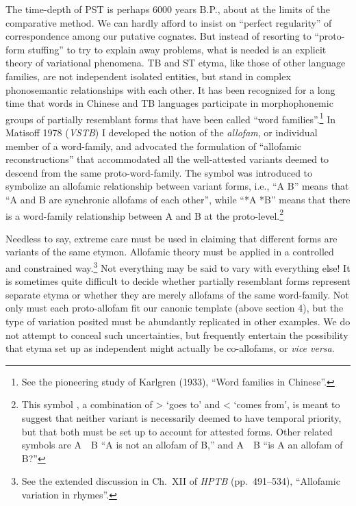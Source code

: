 The time-depth of PST is perhaps 6000 years B.P., about at the limits of the
comparative method. We can hardly afford to insist on “perfect regularity” of
correspondence among our putative cognates. But instead of resorting to
“proto-form stuffing” to try to explain away problems, what is needed is an
explicit theory of variational phenomena. TB and ST etyma, like those of other
language families, are not independent isolated entities, but stand in complex
phonosemantic relationships with each other. It has been recognized for a long
time that words in Chinese and TB languages participate in morphophonemic groups
of partially resemblant forms that have been called “word families”.\footnote{See the pioneering study of Karlgren (1933), “Word families in Chinese”.}  In
Matisoff 1978 (\textit{VSTB}) I developed the notion of the \textit{allofam},
or individual member
of a word-family, and advocated the formulation of “allofamic reconstructions”
that accommodated all the well-attested variants deemed to descend from the same
proto-word-family. The symbol  was introduced to symbolize an allofamic
relationship between variant forms, i.e., “A  B” means that “A and B are
synchronic allofams of each other”, while “*A  *B” means that there is a
word-family relationship between A and B at the proto-level.\footnote{This
symbol , a combination of  >  ‘goes to’ and < ‘comes from’, is meant to suggest
that neither variant is necessarily deemed to have temporal priority, but that
both must be set up to account for attested forms. Other related symbols are A~~B “A is not an allofam of B,” and A~~B “is A an allofam of B?”}


Needless to say, extreme care must be used in claiming that different forms
are variants of the same etymon. Allofamic theory must be applied in a
controlled and constrained way.\footnote{See the extended discussion in Ch.~XII
of \textit{HPTB} (pp.~491–534), “Allofamic variation in  rhymes”.} Not everything may be
said to vary with everything else! It is sometimes quite difficult to decide
whether partially resemblant forms represent separate etyma or whether they are
merely allofams of the same word-family. Not only must each proto-allofam fit
our canonic template (above section 4), but the type of variation posited must be
abundantly replicated in other examples. We do not attempt to
conceal such uncertainties, but frequently entertain the possibility that etyma
set up as independent might actually be co-allofams, or \textit{vice versa}.

